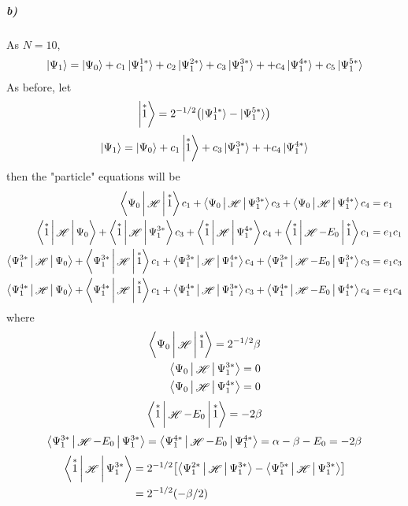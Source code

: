 \documentclass[a4paper]{article}
\DeclareMathOperator{\sH}{\mathscr{H}}
\newcommand{\subex}[1]{\subparagraph{#1}}
\numberwithin{equation}{subsection}
\begin{document}
\subex{b)}
As $ N=10 $,
\begin{align}
\ket{\Psi_1} = \ket{\Psi_0} + c_1\ket{\Psi_1^{1*}} + c_2\ket{\Psi_1^{2*}} + c_3\ket{\Psi_1^{3*}} + + c_4\ket{\Psi_1^{4*}} + c_5\ket{\Psi_1^{5*}}
\end{align}
As before, let
\begin{equation}\label{key}
\Ket{\overset{*}{1}} = 2^{-1/2}\qty(\ket{\Psi_1^{1*}} - \ket{\Psi_1^{5*}})
\end{equation}
\begin{equation}\label{key}
\ket{\Psi_1} = \ket{\Psi_0} + c_1\Ket{\overset{*}{1}} + c_3\ket{\Psi_1^{3*}} + + c_4\ket{\Psi_1^{4*}}
\end{equation}
then the "particle" equations will be
\begin{align}
\Braket{\Psi_0 | \sH | \overset{*}{1}} c_1 + \Braket{\Psi_0 | \sH | \Psi_1^{3*}}c_3 + \Braket{\Psi_0 | \sH | \Psi_1^{4*}}c_4 &= e_1 \\
\Braket{\overset{*}{1} | \sH | \Psi_0} 
+ \Braket{\overset{*}{1} | \sH | \Psi_1^{3*}}c_3
+ \Braket{\overset{*}{1} | \sH | \Psi_1^{4*}}c_4
+ \Braket{\overset{*}{1} | \sH-E_0 | \overset{*}{1}}c_1 &= e_1 c_1 \\
\Braket{\Psi_1^{3*} | \sH | \Psi_0} 
+ \Braket{\Psi_1^{3*} | \sH | \overset{*}{1}}c_1
+ \Braket{\Psi_1^{3*} | \sH | \Psi_1^{4*}}c_4
+ \Braket{\Psi_1^{3*} | \sH-E_0 | \Psi_1^{3*}}c_3 &= e_1 c_3 \\
\Braket{\Psi_1^{4*} | \sH | \Psi_0} 
+ \Braket{\Psi_1^{4*} | \sH | \overset{*}{1}}c_1
+ \Braket{\Psi_1^{4*} | \sH | \Psi_1^{3*}}c_3
+ \Braket{\Psi_1^{4*} | \sH-E_0 | \Psi_1^{4*}}c_4 &= e_1 c_4 
\end{align}
where
\begin{align}
\Braket{\Psi_0 | \sH | \overset{*}{1}} = 2^{-1/2}\beta \\
\Braket{\Psi_0 | \sH | \Psi_1^{3*}} = 0\\
\Braket{\Psi_0 | \sH | \Psi_1^{4*}} = 0
\end{align}
\begin{align}
\Braket{\overset{*}{1} | \sH-E_0 | \overset{*}{1}} = -2\beta
\end{align}
\begin{align}
\Braket{\Psi_1^{3*} | \sH-E_0 | \Psi_1^{3*}} = \Braket{\Psi_1^{4*} | \sH-E_0 | \Psi_1^{4*}} = \alpha - \beta - E_0 = -2\beta
\end{align}
\begin{align}
\Braket{\overset{*}{1} | \sH | \Psi_1^{3*}} &= 2^{-1/2}\qty[\Braket{\Psi_1^{2*} | \sH | \Psi_1^{3*}} - \Braket{\Psi_1^{5*} | \sH | \Psi_1^{3*}}] \notag\\
&= 2^{-1/2}(-\beta/2)
\end{align}
\end{document}
